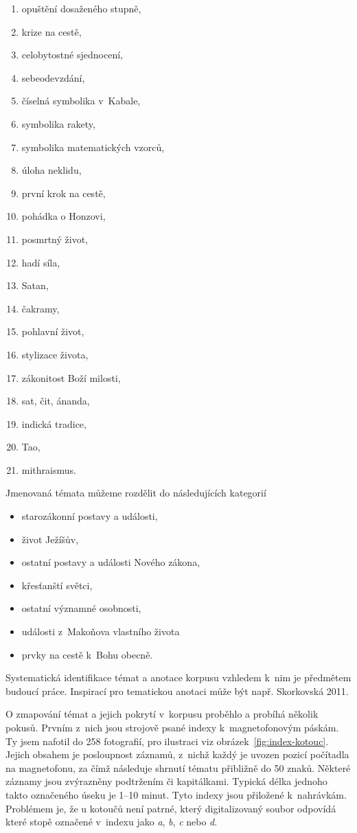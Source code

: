 \begin{enumerate}
\item{opuštění dosaženého stupně,}
\item{krize na cestě,}
\item{celobytostné sjednocení,}
\item{sebeodevzdání,}
\item{číselná symbolika v~Kabale,}
\item{symbolika rakety,}
\item{symbolika matematických vzorců,}
\item{úloha neklidu,}
\item{první krok na cestě,}
\item{pohádka o Honzovi,}
\item{posmrtný život,}
\item{hadí síla,}
\item{Satan,}
\item{čakramy,}
\item{pohlavní život,}
\item{stylizace života,}
\item{zákonitost Boží milosti,}
\item{sat, čit, ánanda,}
\item{indická tradice,}
\item{Tao,}
\item{mithraismus.}

\end{enumerate}

Jmenovaná témata můžeme rozdělit do následujících kategorií
\begin{itemize}
\item{starozákonní postavy a události,}
\item{život Ježíšův,}
\item{ostatní postavy a události Nového zákona,}
\item{křesťanští světci,}
\item{ostatní významné osobnosti,}
\item{události z~Makoňova vlastního života}
\item{prvky na cestě k~Bohu obecně.}
\end{itemize}

Systematická
identifikace témat a anotace korpusu vzhledem k~nim je předmětem budoucí práce.
Inspirací pro tematickou anotaci může být např. Skorkovská 2011\cite{skorkovska2011automatic}.


O zmapování témat a jejich pokrytí v~korpusu proběhlo a probíhá několik pokusů.
Prvním z~nich jsou strojově psané indexy k~magnetofonovým
páskám. Ty jsem nafotil do 258 fotografií, pro ilustraci viz
obrázek~\ref{fig:index-kotouc}. Jejich obsahem je posloupnost
záznamů, z~nichž každý je uvozen pozicí počítadla na magnetofonu, za čímž
následuje shrnutí tématu přibližně do 50 znaků. Některé záznamy jsou zvýrazněny
podtržením či kapitálkami. Typická délka jednoho takto označeného úseku je 1--10
minut. Tyto indexy jsou přiložené k~nahrávkám. Problémem je, že u kotoučů
není patrné, který digitalizovaný soubor odpovídá které stopě označené v~indexu
jako {\em a}, {\em b}, {\em c} nebo {\em d}.

